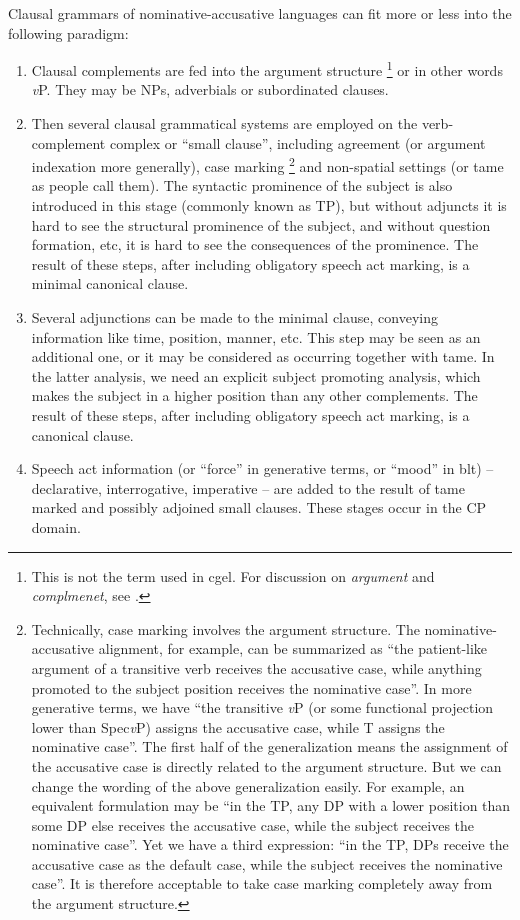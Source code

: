 \documentclass{article}
\newcommand*{\term}[1]{\emph{#1}}
\newcommand*{\vP}{\textit{v}P}
\begin{document}
Clausal grammars of nominative-accusative languages can fit more or less into the following paradigm:
\begin{enumerate}
    \item Clausal complements are fed into the argument structure%
    \footnote{
        This is not the term used in \ac{cgel}.
        For discussion on \term{argument} and \term{complmenet}, see .
    } or in other words \vP. 
    They may be NPs, adverbials or subordinated clauses.
    \item Then several clausal grammatical systems are employed on the verb-complement complex or ``small clause'',
    including agreement (or argument indexation more generally), case marking%
    \footnote{
        Technically, case marking involves the argument structure.
        The nominative-accusative alignment, for example, 
        can be summarized as ``the patient-like argument of a transitive verb receives the accusative case,
        while anything promoted to the subject position receives the nominative case''.
        In more generative terms, we have 
        ``the transitive \vP{} (or some functional projection lower than Spec\vP) assigns the accusative case,
        while T assigns the nominative case''. 
        The first half of the generalization
        means the assignment of the accusative case is directly related to the argument structure.
        But we can change the wording of the above generalization easily.
        For example, an equivalent formulation may be 
        ``in the TP, any DP with a lower position than some DP else receives the accusative case, 
        while the subject receives the nominative case''.
        Yet we have a third expression: 
        ``in the TP, DPs receive the accusative case as the default case,
        while the subject receives the nominative case''.
        It is therefore acceptable to take case marking completely away from the argument structure.
    }
    and non-spatial settings (or \ac{tame} as people call them).
    The syntactic prominence of the subject is also introduced in this stage (commonly known as TP), 
    but without adjuncts it is hard to see the structural prominence of the subject,
    and without question formation, etc, it is hard to see the consequences of the prominence.
    The result of these steps, after including obligatory speech act marking,
    is a minimal canonical clause.
    \item Several adjunctions can be made to the minimal clause, 
    conveying information like time, position, manner, etc. 
    This step may be seen as an additional one,
    or it may be considered as occurring together with \ac{tame}.
    In the latter analysis, we need an explicit subject promoting analysis,
    which makes the subject in a higher position than any other complements.
    The result of these steps, after including obligatory speech act marking, 
    is a canonical clause.
    \item Speech act information 
    (or ``force'' in generative terms, or ``mood'' in \ac{blt}) 
    -- declarative, interrogative, imperative -- are added to the result of 
    \ac{tame} marked and possibly adjoined small clauses. 
    These stages occur in the CP domain.


\end{enumerate}
\end{document}
